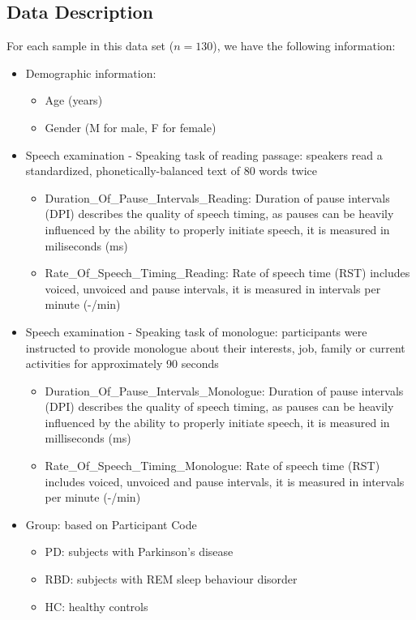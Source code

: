 \documentclass[
  english,
  doc,floatsintext]{apa6}
\providecommand{\tightlist}{%
  \setlength{\itemsep}{0pt}\setlength{\parskip}{0pt}}
\begin{document}
\hypertarget{data-description}{%
\subsection{Data Description}\label{data-description}}

For each sample in this data set (\(n=130\)), we have the following information:

\begin{itemize}
\tightlist
\item
  Demographic information:

  \begin{itemize}
  \tightlist
  \item
    Age (years)
  \item
    Gender (M for male, F for female)
  \end{itemize}
\item
  Speech examination - Speaking task of reading passage: speakers read a standardized, phonetically-balanced text of 80 words twice

  \begin{itemize}
  \tightlist
  \item
    Duration\_Of\_Pause\_Intervals\_Reading: Duration of pause intervals (DPI) describes the quality of speech timing, as pauses can be heavily influenced by the ability to properly initiate speech, it is measured in miliseconds (ms)
  \item
    Rate\_Of\_Speech\_Timing\_Reading: Rate of speech time (RST) includes voiced, unvoiced and pause intervals, it is measured in intervals per minute (-/min)
  \end{itemize}
\item
  Speech examination - Speaking task of monologue: participants were instructed to provide monologue about their interests, job, family or current activities for approximately 90 seconds

  \begin{itemize}
  \tightlist
  \item
    Duration\_Of\_Pause\_Intervals\_Monologue: Duration of pause intervals (DPI) describes the quality of speech timing, as pauses can be heavily influenced by the ability to properly initiate speech, it is measured in milliseconds (ms)
  \item
    Rate\_Of\_Speech\_Timing\_Monologue: Rate of speech time (RST) includes voiced, unvoiced and pause intervals, it is measured in intervals per minute (-/min)
  \end{itemize}
\item
  Group: based on Participant Code

  \begin{itemize}
  \tightlist
  \item
    PD: subjects with Parkinson's disease
  \item
    RBD: subjects with REM sleep behaviour disorder
  \item
    HC: healthy controls
  \end{itemize}
\end{itemize}
\end{document}
